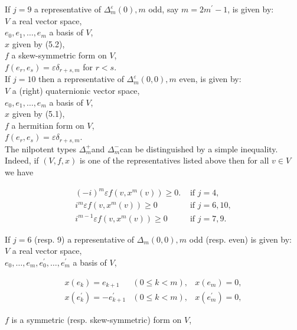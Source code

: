 \documentclass[10pt]{article}
\begin{document}
If $j=9$ a representative of $\Delta_{m}^{\varepsilon}(0), m$ odd, say $m=2 m^{\prime}-1$, is given by:\\
$V$ a real vector space,\\
$e_{0}, e_{1}, \ldots, e_{m}$ a basis of $V$,\\
$x$ given by (5.2),\\
$f$ a skew-symmetric form on $V$,\\
$f\left(e_{r}, e_{s}\right)=\varepsilon \delta_{r+s, m}$ for $r<s$.\\
If $j=10$ then a representative of $\Delta_{m}^{\varepsilon}(0,0), m$ even, is given by:\\
$V$ a (right) quaternionic vector space,\\
$e_{0}, e_{1}, \ldots, e_{m}$ a basis of $V$,\\
$x$ given by (5.1),\\
$f$ a hermitian form on $V$,\\
$f\left(e_{r}, e_{s}\right)=\varepsilon \delta_{r+s, m}$.\\
The nilpotent types $\Delta_{m}^{+}$and $\Delta_{m}^{-}$can be distinguished by a simple inequality. Indeed, if $(V, f, x)$ is one of the representatives listed above then for all $v \in V$ we have


\begin{align*}
(-i)^{m} \varepsilon f\left(v, x^{m}(v)\right) \geqslant 0 . & \text { if } j=4,  \tag{5.3}\\
i^{m} \varepsilon f\left(v, x^{m}(v)\right) \geqslant 0 & \text { if } j=6,10,  \tag{5.4}\\
i^{m-1} \varepsilon f\left(v, x^{m}(v)\right) \geqslant 0 & \text { if } j=7,9 . \tag{5.5}
\end{align*}


If $j=6$ (resp. 9) a representative of $\Delta_{m}(0,0), m$ odd (resp. even) is given by:\\
$V$ a real vector space,\\
$e_{0}, \ldots, e_{m}, e_{0}^{\prime}, \ldots, e_{m}^{\prime}$ a basis of $V$,

$$
\begin{array}{lll}
x\left(e_{k}\right)=e_{k+1} & (0 \leqslant k<m), & x\left(e_{m}\right)=0, \\
x\left(e_{k}^{\prime}\right)=-e_{k+1}^{\prime} & (0 \leqslant k<m), & x\left(e_{m}^{\prime}\right)=0,
\end{array}
$$

$f$ is a symmetric (resp. skew-symmetric) form on $V$,
\end{document}
